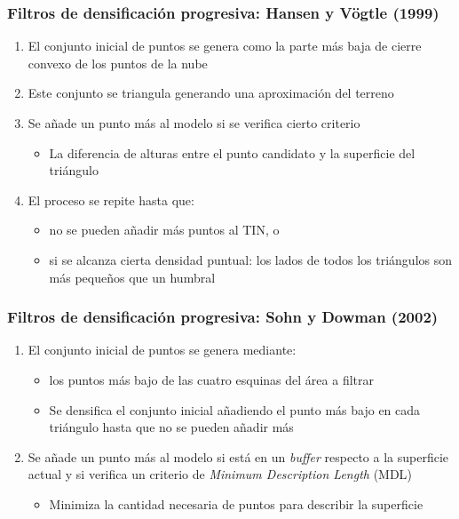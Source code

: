\begin{frame}
  \frametitle{Filtros de densificación progresiva: Hansen y Vögtle (1999)}
  \begin{enumerate}
    \item El conjunto inicial de puntos se genera como la parte más baja de
      cierre convexo de los puntos de la nube
    \item Este conjunto se triangula generando una aproximación del terreno
    \item Se añade un punto más al modelo si se verifica cierto criterio
      \begin{itemize}
        \item La diferencia de alturas entre el punto candidato y la superficie
          del triángulo
      \end{itemize}
    \item El proceso se repite hasta que:
      \begin{itemize}
        \item no se pueden añadir más puntos al TIN, o
        \item si se alcanza cierta densidad puntual: los lados de todos los
          triángulos son más pequeños que un humbral
      \end{itemize}
  \end{enumerate}
\end{frame}
\begin{frame}
  \frametitle{Filtros de densificación progresiva: Sohn y Dowman (2002)}
  \begin{enumerate}
    \item El conjunto inicial de puntos se genera mediante:
      \begin{itemize}
        \item los puntos más bajo de las cuatro esquinas del área a filtrar
        \item Se densifica el conjunto inicial añadiendo el punto más bajo 
          en cada triángulo hasta que no se pueden añadir más
      \end{itemize}
    \item Se añade un punto más al modelo si está en un \emph{buffer} respecto a
      la superficie actual y si verifica un criterio de \emph{Minimum
      Description Length} (\alert{MDL})
      \begin{itemize}
        \item Minimiza la cantidad necesaria de puntos para describir la
          superficie
      \end{itemize}
  \end{enumerate}
\end{frame}
